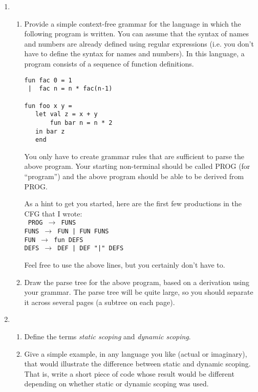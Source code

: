 \documentclass[11pt]{article}
\newcommand{\ra}{\rightarrow}
\begin{document}
\begin{enumerate}
\begin{enumerate}
\end{enumerate} 

\item 
\begin{enumerate} 
\item Provide a simple context-free grammar for the language in which the following program is written. You can assume that the syntax of names and numbers are already defined using regular expressions (i.e. you don't have to define the syntax for names and numbers). In this language, a program consists of a sequence of function definitions.
\begin{verbatim} 
fun fac 0 = 1
 |  fac n = n * fac(n-1)

fun foo x y = 
   let val z = x + y 
       fun bar n = n * 2
   in bar z
   end
\end{verbatim} 

You only have to create grammar rules that are sufficient to parse the above program. 
Your starting non-terminal should be called PROG (for ``program'') and the above
program should be able to be derived from PROG.

As a hint to get you started, here are the first few productions in the CFG that I wrote:
\\
{\tt
PROG $\ra$ FUNS \\
FUNS $\ra$ FUN | FUN FUNS \\
FUN $\ra$ fun DEFS \\
DEFS $\ra$ DEF | DEF "|" DEFS \\
}

Feel free to use the above lines, but you certainly don't have to.

\item 
Draw the parse tree for the above program, based on a derivation using your grammar. The parse tree will be quite large, so you should separate it across several pages (a subtree on each page).
\end{enumerate} 

\item 
\begin{enumerate} 
\item 
Define the terms {\em static scoping} and {\em dynamic scoping}.

\item 
Give a simple example, in any language you like (actual or imaginary),
that would illustrate the difference between static and dynamic
scoping. That is, write a short piece of code whose result would be
different depending on whether static or dynamic scoping was used.


\end{enumerate}
\end{enumerate}
\end{document}
